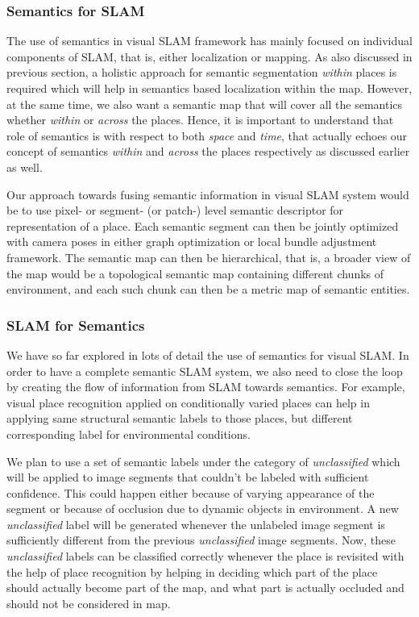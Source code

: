 \documentclass{article}
\begin{document}
\subsubsection{Semantics for SLAM}
The use of semantics in visual SLAM framework has mainly focused on individual components of SLAM, that is, either localization or mapping. As also discussed in previous section, a holistic approach for semantic segmentation \emph{within} places is required which will help in semantics based localization within the map. However, at the same time, we also want a semantic map that will cover all the semantics whether \emph{within} or \emph{across} the places. Hence, it is important to understand that role of semantics is with respect to both \emph{space} and \emph{time}, that actually echoes our concept of semantics \emph{within} and \emph{across} the places respectively as discussed earlier as well.

Our approach towards fusing semantic information in visual SLAM system would be to use pixel- or segment- (or patch-) level semantic descriptor for representation of a place. Each semantic segment can then be jointly optimized with camera poses in either graph optimization or local bundle adjustment framework. The semantic map can then be hierarchical, that is, a broader view of the map would be a topological semantic map containing different chunks of environment, and each such chunk can then be a metric map of semantic entities.

\subsubsection{SLAM for Semantics}
We have so far explored in lots of detail the use of semantics for visual SLAM. In order to have a complete semantic SLAM system, we also need to close the loop by creating the flow of information from SLAM towards semantics. For example, visual place recognition applied on conditionally varied places can help in applying same structural semantic labels to those places, but different corresponding label for environmental conditions.

We plan to use a set of semantic labels under the category of \emph{unclassified} which will be applied to image segments that couldn't be labeled with sufficient confidence. This could happen either because of varying appearance of the segment or because of occlusion due to dynamic objects in environment. A new \emph{unclassified} label will be generated whenever the unlabeled image segment is sufficiently different from the previous \emph{unclassified} image segments. Now, these \emph{unclassified} labels can be classified correctly whenever the place is revisited with the help of place recognition by helping in deciding which part of the place should actually become part of the map, and what part is actually occluded and should not be considered in map.
\end{document}
